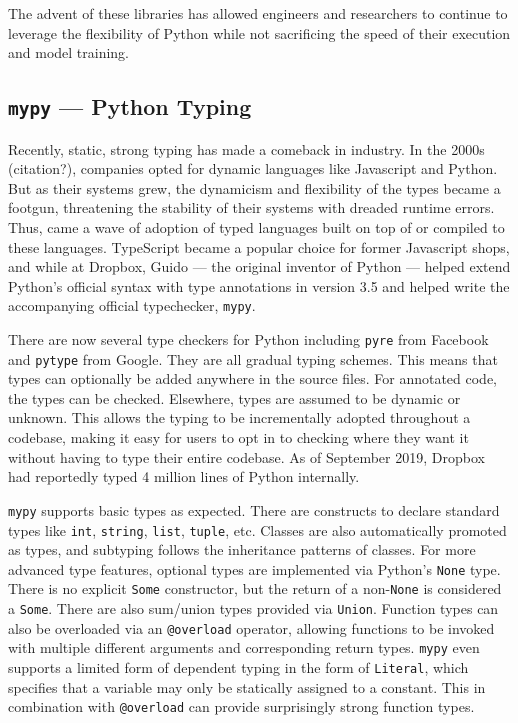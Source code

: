 \documentclass{article}
\begin{document}
The advent of these libraries has allowed engineers and researchers to continue to leverage the flexibility of Python while not sacrificing the speed of their execution and model training.

\subsection{\texttt{mypy} --- Python Typing}

Recently, static, strong typing has made a comeback in industry. In the 2000s (citation?), companies opted for dynamic languages like Javascript and Python. But as their systems grew, the dynamicism and flexibility of the types became a footgun, threatening the stability of their systems with dreaded runtime errors. Thus, came a wave of adoption of typed languages built on top of or compiled to these languages. TypeScript became a popular choice for former Javascript shops, and while at Dropbox, Guido --- the original inventor of Python --- helped extend Python's official syntax with type annotations in version 3.5 and helped write the accompanying official typechecker, \texttt{mypy}.

There are now several type checkers for Python including \texttt{pyre} from Facebook and \texttt{pytype} from Google. They are all gradual typing schemes. This means that types can optionally be added anywhere in the source files. For annotated code, the types can be checked. Elsewhere, types are assumed to be dynamic or unknown. This allows the typing to be incrementally adopted throughout a codebase, making it easy for users to opt in to checking where they want it without having to type their entire codebase. As of September 2019, Dropbox had reportedly typed 4 million lines of Python internally.

\texttt{mypy} supports basic types as expected. There are constructs to declare standard types like \texttt{int}, \texttt{string}, \texttt{list}, \texttt{tuple}, etc. Classes are also automatically promoted as types, and subtyping follows the inheritance patterns of classes. For more advanced type features, optional types are implemented via Python's \texttt{None} type. There is no explicit \texttt{Some} constructor, but the return of a non-\texttt{None} is considered a \texttt{Some}. There are also sum/union types provided via \texttt{Union}. Function types can also be overloaded via an \texttt{@overload} operator, allowing functions to be invoked with multiple different arguments and corresponding return types. \texttt{mypy} even supports a limited form of dependent typing in the form of \texttt{Literal}, which specifies that a variable may only be statically assigned to a constant. This in combination with \texttt{@overload} can provide surprisingly strong function types.
\end{document}
